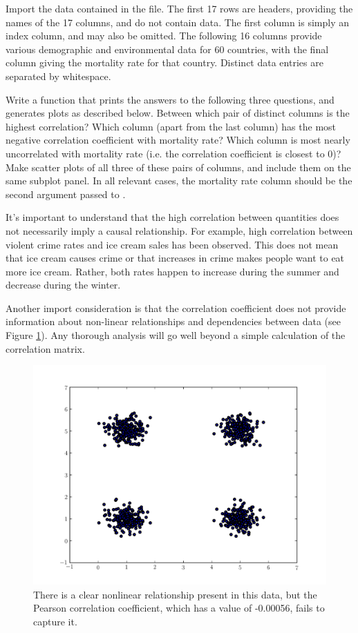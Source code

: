 \begin{problem}
Import the data contained in the  file. The first 17 rows are headers, providing the names of the
17 columns, and do not contain data. The first column is simply an index column, and may also be omitted.
The following 16 columns provide various demographic and environmental data for 60 countries, with the
final column giving the mortality rate for that country.
Distinct data entries are separated by whitespace.

Write a function that prints the answers to the following three questions, and generates plots as
described below.
Between which pair of distinct columns is the highest correlation?
Which column (apart from the last column) has the most negative correlation coefficient with mortality rate?
Which column is most nearly uncorrelated with mortality rate (i.e. the correlation coefficient is closest to 0)?
Make scatter plots of all three of these pairs of columns, and include them on the same subplot panel.
In all relevant cases, the mortality rate column should be the second argument passed to .
\end{problem}

It's important to understand that the high correlation between quantities does not necessarily imply
a causal relationship. For example, high correlation between violent crime rates and ice cream sales has
been observed. This does not mean that ice cream causes crime or that increases in crime makes people want
to eat more ice cream. Rather, both rates happen to increase during the summer and decrease during the winter.

Another import consideration is that the correlation coefficient does not provide information about
non-linear relationships and dependencies between data (see Figure \ref{fig:non_linear}). Any thorough analysis will go well beyond a simple
calculation of the correlation matrix.

\begin{figure}
\includegraphics[width=\textwidth]{nonlinear_dependence}
\caption{There is a clear nonlinear relationship present in this data, but the Pearson correlation
         coefficient, which has a value of -0.00056, fails to capture it.}
\label{fig:non_linear}
\end{figure}

